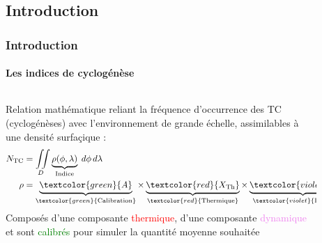 \documentclass[aspectratio=169, usepdftitle=false, xcolor={dvipsnames}, 9pt,table]{beamer}
\begin{document}
\subsection{Introduction}
\begin{frame}[t]
    \frametitle{Introduction}
    \framesubtitle{Les indices de cyclogénèse}
    \footnotesize
    \begin{columns}
        \begin{column}{0.7\textwidth}
            \vspace{-3em}
            \begin{definition}[Définition]
                \alert{Relation} mathématique reliant la fréquence d'occurrence des TC (cyclogénèses) avec l'environnement de grande échelle, assimilables à une densité
                surfaçique :
                \begin{align*}
                    N_{\text{TC}} &= \iint\limits_{D} \underbrace{\rho(\phi, \lambda)}_{\text{Indice}} \; d\phi \, d\lambda \\
                    \rho &= \underbrace{\vphantom{X_{\text{Dyn}}}\textcolor{green}{A}}_{\textcolor{green}{\text{Calibration}}} \times
                    \underbrace{\vphantom{X_{\text{Dyn}}}\textcolor{red}{X_{\text{Th}}}}_{\textcolor{red}{\text{Thermique}}} \times
                    \underbrace{\textcolor{violet}{X_{\text{Dyn}}}}_{\textcolor{violet}{\text{Dynamique}}}
                \end{align*}
                Composés d'une composante \textcolor{red}{thermique}, d'une composante \textcolor{violet}{dynamique} et sont \textcolor{green}{calibrés} pour simuler la
                quantité moyenne souhaitée 
            \end{definition}
            \vspace{2em}
        \end{column}
        \begin{column}{0.3\textwidth}
            \vspace{-7em}
            \begin{figure}
                \centering

\end{figure}
\end{column}
\end{columns}
\end{frame}
\end{document}
